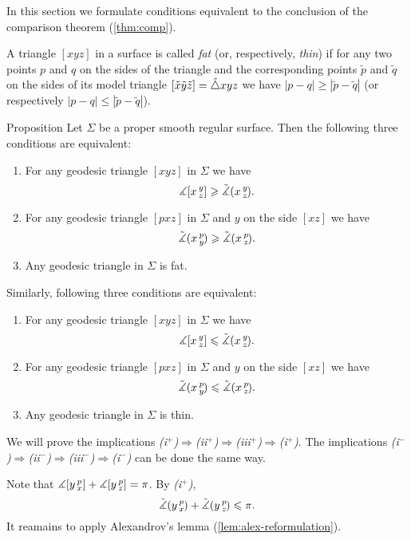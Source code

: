 In this section we formulate conditions equivalent to the conclusion of the comparison theorem (\ref{thm:comp}).

A triangle $[xyz]$ in a surface is called \emph{fat} (or, respectively, \emph{thin})
if for any two points $p$ and $q$ on the sides of the triangle and the corresponding points 
$\tilde p$ and $\tilde q$ on the sides of its model triangle $[\tilde x\tilde y\tilde z]\z=\tilde\triangle xyz$ we have
$|p-q|\ge |\tilde p-\tilde q|$ (or respectively $|p-q|\le |\tilde p-\tilde q|$).


\begin{thm}{Proposition}\label{prop:comp-reformulations}
Let $\Sigma$ be a proper smooth regular surface.
Then the following three conditions are equivalent:
\begin{enumerate}[(i$^{+}$)]
\item For any geodesic triangle $[xyz]$ in $\Sigma$ we have
 \[\measuredangle[x\,{}^{y}_{z}]\geqslant\tilde\measuredangle(x\,{}^{y}_{z}\hspace{-0.2ex}).\]
\item For any geodesic triangle $[pxz]$ in $\Sigma$ and $y$ on the side $[xz]$ we have
 \[\tilde\measuredangle(x\,{}^{p}_{y}\hspace{-0.2ex}) \geqslant \tilde\measuredangle(x\,{}^{p}_{z}\hspace{-0.2ex}).\]
\item Any geodesic triangle in $\Sigma$ is fat.
\end{enumerate}

\medskip

Similarly, following three conditions are equivalent:
\begin{enumerate}[(i$^{-}$)]
\item For any geodesic triangle $[xyz]$ in $\Sigma$ we have
 \[\measuredangle[x\,{}^{y}_{z}]\leqslant\tilde\measuredangle(x\,{}^{y}_{z}\hspace{-0.2ex}).\]
\item For any geodesic triangle $[pxz]$ in $\Sigma$ and $y$ on the side $[xz]$ we have
 \[\tilde\measuredangle(x\,{}^{p}_{y}\hspace{-0.2ex}) \leqslant \tilde\measuredangle(x\,{}^{p}_{z}\hspace{-0.2ex}).\]
\item Any geodesic triangle in $\Sigma$ is thin.
\end{enumerate}

\end{thm}

 We will prove the implications \textit{(i$^{+}$)$\Rightarrow$(ii$^{+}$)$\Rightarrow$(iii$^{+}$)$\Rightarrow$(i$^{+}$)}.
The implications \textit{(i$^{-}$)$\Rightarrow$(ii$^{-}$)$\Rightarrow$(iii$^{-}$)$\Rightarrow$(i$^{-}$)} can be done the same way.

Note that $\measuredangle[y\,{}^{p}_{x}]+\measuredangle[y\,{}^{p}_{z}]=\pi$.
By \textit{(i$^{+}$)}, 
\[\tilde\measuredangle(y\,{}^{p}_{x}\hspace{-0.2ex})+\tilde\measuredangle(y\,{}^{p}_{z}\hspace{-0.2ex})\leqslant \pi.\]
It reamains to apply Alexandrov's lemma (\ref{lem:alex-reformulation}).


